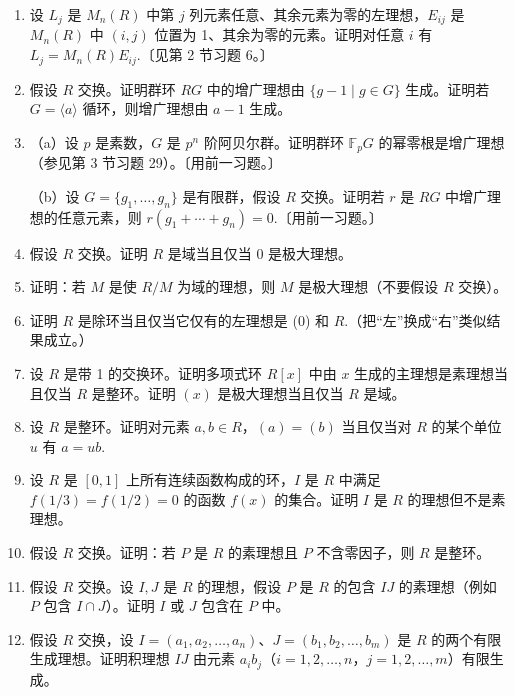 \begin{enumerate}
\item 设 \(L_j\) 是 \(M_n(R)\) 中第 \(j\) 列元素任意、其余元素为零的左理想，\(E_{ij}\) 是 \(M_n(R)\) 中 \((i, j)\) 位置为 1、其余为零的元素。证明对任意 \(i\) 有 \(L_j = M_n(R)E_{ij}\).〔见第 2 节习题 6。〕

\item 假设 \(R\) 交换。证明群环 \(RG\) 中的增广理想由 \(\{g-1 \mid g \in G\}\) 生成。证明若 \(G = \langle a \rangle\) 循环，则增广理想由 \(a-1\) 生成。

\item （a）设 \(p\) 是素数，\(G\) 是 \(p^n\) 阶阿贝尔群。证明群环 \(\mathbb{F}_pG\) 的幂零根是增广理想（参见第 3 节习题 29）。〔用前一习题。〕

（b）设 \(G = \{g_1, \ldots, g_n\}\) 是有限群，假设 \(R\) 交换。证明若 \(r\) 是 \(RG\) 中增广理想的任意元素，则 \(r(g_1 + \cdots + g_n) = 0\).〔用前一习题。〕

\item 假设 \(R\) 交换。证明 \(R\) 是域当且仅当 0 是极大理想。

\item 证明：若 \(M\) 是使 \(R/M\) 为域的理想，则 \(M\) 是极大理想（不要假设 \(R\) 交换）。

\item 证明 \(R\) 是除环当且仅当它仅有的左理想是 (0) 和 \(R\).（把“左”换成“右”类似结果成立。）

\item 设 \(R\) 是带 1 的交换环。证明多项式环 \(R[x]\) 中由 \(x\) 生成的主理想是素理想当且仅当 \(R\) 是整环。证明 \((x)\) 是极大理想当且仅当 \(R\) 是域。

\item 设 \(R\) 是整环。证明对元素 \(a, b \in R\)，\((a) = (b)\) 当且仅当对 \(R\) 的某个单位 \(u\) 有 \(a = ub\).

\item 设 \(R\) 是 \([0,1]\) 上所有连续函数构成的环，\(I\) 是 \(R\) 中满足 \(f(1/3) = f(1/2) = 0\) 的函数 \(f(x)\) 的集合。证明 \(I\) 是 \(R\) 的理想但不是素理想。

\item 假设 \(R\) 交换。证明：若 \(P\) 是 \(R\) 的素理想且 \(P\) 不含零因子，则 \(R\) 是整环。

\item 假设 \(R\) 交换。设 \(I, J\) 是 \(R\) 的理想，假设 \(P\) 是 \(R\) 的包含 \(IJ\) 的素理想（例如 \(P\) 包含 \(I \cap J\)）。证明 \(I\) 或 \(J\) 包含在 \(P\) 中。

\item 假设 \(R\) 交换，设 \(I = (a_1, a_2, \ldots, a_n)\)、\(J = (b_1, b_2, \ldots, b_m)\) 是 \(R\) 的两个有限生成理想。证明积理想 \(IJ\) 由元素 \(a_ib_j\)（\(i = 1, 2, \ldots, n\)，\(j = 1, 2, \ldots, m\)）有限生成。


\end{enumerate}
